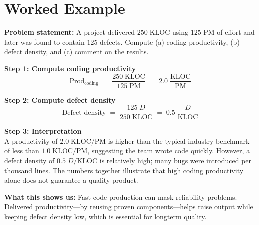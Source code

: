 \documentclass[12pt, a4paper]{article}
\begin{document}
\section{Worked Example}
\textbf{Problem statement:}  
A project delivered \(250\;\text{KLOC}\) using \(125\) PM of effort and later was found to contain \(125\) defects. Compute (a) coding productivity, (b) defect density, and (c) comment on the results.

\medskip
\textbf{Step 1: Compute coding productivity}\\
\[
\text{Prod}_{\text{coding}} \;=\; \frac{250\;\text{KLOC}}{125\;\text{PM}} \;=\; 2.0\;\frac{\text{KLOC}}{\text{PM}}
\]

\textbf{Step 2: Compute defect density}\\
\[
\text{Defect density} \;=\; \frac{125\;D}{250\;\text{KLOC}} \;=\; 0.5\;\frac{D}{\text{KLOC}}
\]

\textbf{Step 3: Interpretation}\\
A productivity of \(2.0\;\text{KLOC/PM}\) is higher than the typical industry benchmark of less than \(1.0\;\text{KLOC/PM}\), suggesting the team wrote code quickly.  
However, a defect density of \(0.5\;D/\text{KLOC}\) is relatively high; many bugs were introduced per thousand lines.  The numbers together illustrate that high coding productivity alone does not guarantee a quality product.

\medskip
\textbf{What this shows us:}  
Fast code production can mask reliability problems.  Delivered productivity---by reusing proven components---helps raise output while keeping defect density low, which is essential for longterm quality.
\end{document}
